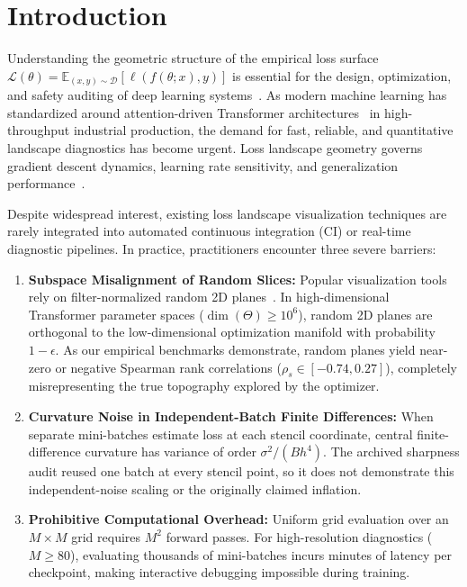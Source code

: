 \documentclass[11pt,a4paper]{article}
\theoremstyle{definition}
\theoremstyle{remark}
\begin{document}
\section{Introduction}

Understanding the geometric structure of the empirical loss surface $\mathcal{L}(\theta) = \mathbb{E}_{(x, y) \sim \mathcal{D}} [\ell(f(\theta; x), y)]$ is essential for the design, optimization, and safety auditing of deep learning systems~\cite{goodfellow2015qualitatively,li2018visualizing,dinh2017sharp,foret2020sharpness}. As modern machine learning has standardized around attention-driven Transformer architectures~\cite{vaswani2017attention,dosovitskiy2020image} in high-throughput industrial production, the demand for fast, reliable, and quantitative landscape diagnostics has become urgent. Loss landscape geometry governs gradient descent dynamics, learning rate sensitivity, and generalization performance~\cite{keskar2016large,garipov2018loss}.

Despite widespread interest, existing loss landscape visualization techniques are rarely integrated into automated continuous integration (CI) or real-time diagnostic pipelines. In practice, practitioners encounter three severe barriers:
\begin{enumerate}
    \item \textbf{Subspace Misalignment of Random Slices:} Popular visualization tools rely on filter-normalized random 2D planes~\cite{li2018visualizing}. In high-dimensional Transformer parameter spaces ($\dim(\Theta) \ge 10^6$), random 2D planes are orthogonal to the low-dimensional optimization manifold with probability $1 - \epsilon$. As our empirical benchmarks demonstrate, random planes yield near-zero or negative Spearman rank correlations ($\rho_s \in [-0.74, 0.27]$), completely misrepresenting the true topography explored by the optimizer.
    \item \textbf{Curvature Noise in Independent-Batch Finite Differences:} When separate mini-batches estimate loss at each stencil coordinate, central finite-difference curvature has variance of order $\sigma^2/(B h^4)$. The archived sharpness audit reused one batch at every stencil point, so it does not demonstrate this independent-noise scaling or the originally claimed inflation.
    \item \textbf{Prohibitive Computational Overhead:} Uniform grid evaluation over an $M \times M$ grid requires $M^2$ forward passes. For high-resolution diagnostics ($M \ge 80$), evaluating thousands of mini-batches incurs minutes of latency per checkpoint, making interactive debugging impossible during training.
\end{enumerate}
\end{document}

